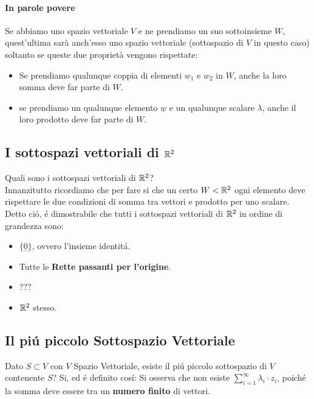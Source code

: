 \paragraph{In parole povere} Se abbiamo uno spazio vettoriale $V$ e ne prendiamo un suo sottoinsieme $W$,
quest'ultima sarà anch'esso uno spazio vettoriale (sottospazio di $V$ in questo caso) soltanto se queste due proprietà vengono rispettate:
\begin{itemize}
    \item Se prendiamo qualunque coppia di elementi $w_1$ e $w_2$ in $W$, anche la loro somma deve far parte di $W$.
    \item se prendiamo un qualunque elemento $\underline{w}$ e un qualunque scalare $\lambda$, anche il loro prodotto deve far parte di $W$.
\end{itemize}

\subsection[Sottospazi di R2]{I sottospazi vettoriali di $\mathbb{R}^2$}
Quali sono i sottospazi vettoriali di $\mathbb{R}^2$?
\\Innanzitutto ricordiamo che per fare si che un certo $W<\mathbb{R}^2$ ogni elemento deve rispettare le due condizioni di somma tra vettori e prodotto per uno scalare.
\\Detto ció, é dimostrabile che tutti i sottospazi vettoriali di $\mathbb{R}^2$ in ordine di grandezza sono:
\begin{itemize}
    \item $\{ \underline{0} \}$, ovvero l'insieme identitá.
    \item Tutte le \textbf{Rette passanti per l'origine}.
    \item ???
    \item $\mathbb{R}^2$ stesso.
\end{itemize}

\subsection{Il piú piccolo Sottospazio Vettoriale}
Dato $S\subset V$ con $V$ Spazio Vettoriale, esiste il piú piccolo sottospazio di $V$ contenente $S$?
Si, ed é definito cosí:
Si osserva che non esiste $\sum_{i=1}^{\infty} \lambda_i \cdot z_i$, poiché la somma deve essere tra un \textbf{numero finito} di vettori.


